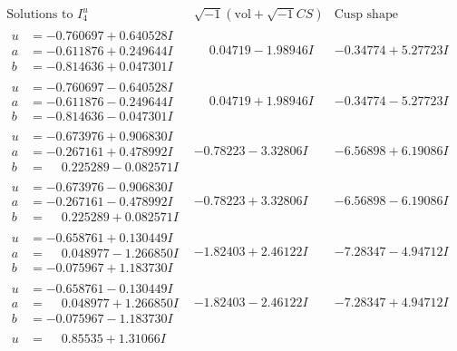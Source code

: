 \documentclass[1p]{elsarticle_modified}
\theoremstyle{definition}
\newcommand{\I}{\sqrt{-1}}
\begin{document}
$$\begin{array}{c|c|c}  
\text{Solutions to }I^u_{4}& \I (\text{vol} + \sqrt{-1}CS) & \text{Cusp shape}\\
 \hline 
\begin{aligned}
u &= -0.760697 + 0.640528 I \\
a &= -0.611876 + 0.249644 I \\
b &= -0.814636 + 0.047301 I\end{aligned}
 & \phantom{-}0.04719 - 1.98946 I & -0.34774 + 5.27723 I \\ \hline\begin{aligned}
u &= -0.760697 - 0.640528 I \\
a &= -0.611876 - 0.249644 I \\
b &= -0.814636 - 0.047301 I\end{aligned}
 & \phantom{-}0.04719 + 1.98946 I & -0.34774 - 5.27723 I \\ \hline\begin{aligned}
u &= -0.673976 + 0.906830 I \\
a &= -0.267161 + 0.478992 I \\
b &= \phantom{-}0.225289 - 0.082571 I\end{aligned}
 & -0.78223 - 3.32806 I & -6.56898 + 6.19086 I \\ \hline\begin{aligned}
u &= -0.673976 - 0.906830 I \\
a &= -0.267161 - 0.478992 I \\
b &= \phantom{-}0.225289 + 0.082571 I\end{aligned}
 & -0.78223 + 3.32806 I & -6.56898 - 6.19086 I \\ \hline\begin{aligned}
u &= -0.658761 + 0.130449 I \\
a &= \phantom{-}0.048977 - 1.266850 I \\
b &= -0.075967 + 1.183730 I\end{aligned}
 & -1.82403 + 2.46122 I & -7.28347 - 4.94712 I \\ \hline\begin{aligned}
u &= -0.658761 - 0.130449 I \\
a &= \phantom{-}0.048977 + 1.266850 I \\
b &= -0.075967 - 1.183730 I\end{aligned}
 & -1.82403 - 2.46122 I & -7.28347 + 4.94712 I \\ \hline\begin{aligned}
u &= \phantom{-}0.85535 + 1.31066 I \\

\end{aligned}
\end{array}$$
\end{document}
